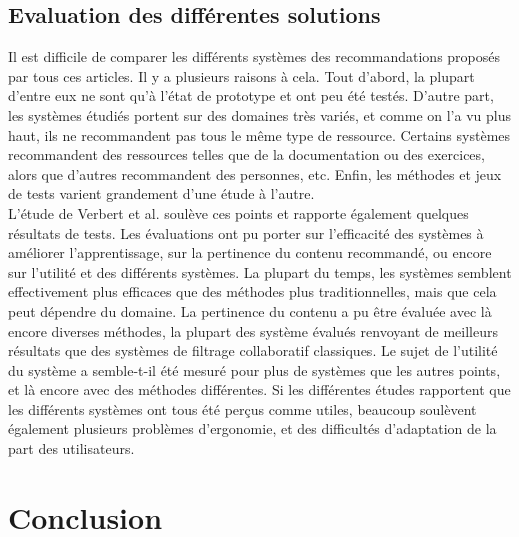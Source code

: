 \documentclass[conference]{./sty/IEEEtran}
\begin{document}
\subsection{Evaluation des différentes solutions}
Il est difficile de comparer les différents systèmes des recommandations proposés par tous ces articles. Il y a plusieurs raisons à cela. Tout d'abord, la plupart d'entre eux ne sont qu'à l'état de prototype et ont peu été testés. D'autre part, les systèmes étudiés portent sur des domaines très variés, et comme on l'a vu plus haut, ils ne recommandent pas tous le même type de ressource. Certains systèmes recommandent des ressources telles que de la documentation ou des exercices, alors que d'autres recommandent des personnes, etc. Enfin, les méthodes et jeux de tests varient grandement d'une étude à l'autre.\\

L'étude de Verbert et al. \cite{DBLP:journals/tlt/VerbertMOWDBD12} soulève ces points et rapporte également quelques résultats de tests. Les évaluations ont pu porter sur l'efficacité des systèmes à améliorer l'apprentissage, sur la pertinence du contenu recommandé, ou encore sur l'utilité et des différents systèmes. La plupart du temps, les systèmes semblent effectivement plus efficaces que des méthodes plus traditionnelles, mais que cela peut dépendre du domaine. La pertinence du contenu a pu être évaluée avec là encore diverses méthodes, la plupart des système évalués renvoyant de meilleurs résultats que des systèmes de filtrage collaboratif classiques. Le sujet de l'utilité du système a semble-t-il été mesuré pour plus de systèmes que les autres points, et là encore avec des méthodes différentes. Si les différentes études rapportent que les différents systèmes ont tous été perçus comme utiles, beaucoup soulèvent également plusieurs problèmes d'ergonomie, et des difficultés d'adaptation de la part des utilisateurs.\\




\section{Conclusion}




\end{document}
